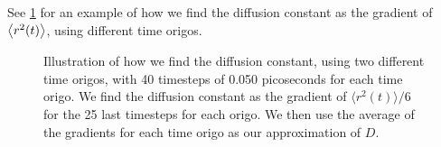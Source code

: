See \cref{fig:find_diff_const_example} for an example of how we find the diffusion constant as the gradient of $\Braket{r^2(t)}$, using different time origos.
%
%
%
\begin{figure}[!htb]%
    \centering%
    {
        \newcommand{\la}{\langle}%
        \newcommand{\ra}{\rangle}%
    }
    \caption{%
        Illustration of how we find the diffusion constant, using two different time origos, with 40 timesteps of 0.050 picoseconds for each time origo. We find the diffusion constant as the gradient of $\langle r^2(t)\rangle/6$ for the 25 last timesteps for each origo. We then use the average of the gradients for each time origo as our approximation of $D$.%
        \label{fig:find_diff_const_example}%
    }%
\end{figure}%
% 
%
%
